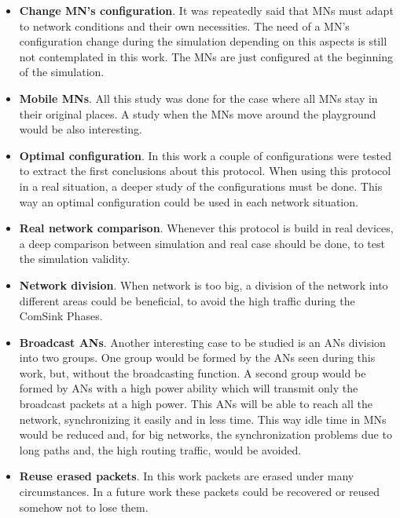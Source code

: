 \begin{itemize}
  \item \textbf{Change \ac{MN}'s configuration}. It was repeatedly said that \acp{MN} must adapt to network conditions and their own necessities. 
  The need of a \ac{MN}'s configuration change during the simulation depending on this aspects is still not contemplated in this work. The
  \acp{MN} are just configured at the beginning of the simulation.

  \item \textbf{Mobile \acp{MN}}. All this study was done for the case where all \acp{MN} stay in their original places. A study when the 
  \acp{MN} move around the playground would be also interesting.

  \item \textbf{Optimal configuration}. In this work a couple of configurations were tested to extract the first conclusions about
  this protocol. When using this protocol in a real situation, a deeper study of the configurations must be done. This way an optimal configuration
  could be used in each network situation.

  \item \textbf{Real network comparison}. Whenever this protocol is build in real devices, a deep comparison between simulation and real case should
  be done, to test the simulation validity.

  \item \textbf{Network division}. When network is too big, a division of the network into different areas could be beneficial, to avoid the high
  traffic during the ComSink Phases.

  \item \textbf{Broadcast \acp{AN}}. Another interesting case to be studied is an \acp{AN} division into two groups. One group would be formed by the 
  \acp{AN} seen during this work, but, without the broadcasting function. A second group would be formed by \acp{AN} with a high power ability 
  which will transmit only the broadcast packets at a high power. This \acp{AN} will be able to reach all the network, synchronizing it 
  easily and in less time. This way idle time in \acp{MN} would be reduced and, for big networks, the synchronization problems due to long paths 
  and, the high routing traffic, would be avoided.

  \item \textbf{Reuse erased packets}. In this work packets are erased under many circumstances. In a future work these packets could be recovered
  or reused somehow not to lose them.


\end{itemize}
